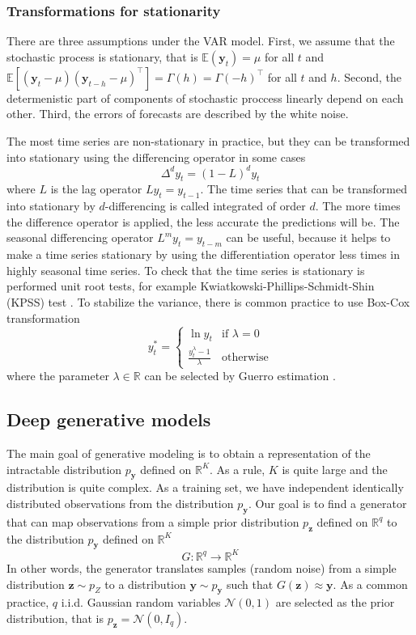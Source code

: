 \documentclass[12pt,a4paper]{article}
\begin{document}
\subsubsection{Transformations for stationarity}

There are three assumptions under the VAR model. First, we assume that the stochastic process is stationary, that is $\mathbb E (\mathbf y_t) = \mu$ for all $t$ and $\mathbb E [(\mathbf y_t - \mu)(\mathbf y_{t-h}-\mu)^\top] = \Gamma(h) = \Gamma(-h)^\top$ for all $t$ and $h$. Second, the determenistic part of components of stochastic proccess linearly depend on each other. Third, the errors of forecasts are described by the white noise.

The most time series are non-stationary in practice, but they can be transformed into stationary using the differencing operator in some cases
$$\Delta^d y_t = (1 - L)^d y_t$$
where $L$ is the lag operator $Ly_t = y_{t-1}$. The time series that can be transformed into stationary by $d$-differencing is called integrated of order $d$. The more times the difference operator is applied, the less accurate the predictions will be. The seasonal differencing operator $L^my_t = y_{t-m}$ can be useful, because it helps to make a time series stationary by using the differentiation operator less times in highly seasonal time series. To check that the time series is stationary is performed unit root tests, for example Kwiatkowski-Phillips-Schmidt-Shin (KPSS) test \cite{fpp3}. To stabilize the variance, there is common practice to use Box-Cox transformation
$$y_t^* = \begin{cases}
    \ln y_t & \text{if $\lambda = 0$} \\ 
    \frac{y_t^\lambda - 1}{\lambda} & \text{otherwise}
\end{cases}$$
where the parameter $\lambda \in \mathbb R$ can be selected by Guerro estimation \cite{guerrero93}.

\subsection{Deep generative models} \label{deepgenmodels}

The main goal of generative modeling is to obtain a representation of the intractable distribution $p_\mathbf y$ defined on $\mathbb R^K$. As a rule, $K$ is quite large and the distribution is quite complex. As a training set, we have independent identically distributed observations from the distribution $p_\mathbf y$. Our goal is to find a generator that can map observations from a simple prior distribution $p_\mathbf z$ defined on $\mathbb R^q$ to the distribution $p_\mathbf y$ defined on $\mathbb R^K$
$$G: \mathbb R^q \to \mathbb R^K$$
In other words, the generator translates samples (random noise) from a simple distribution $\mathbf z \sim p_Z$ to a distribution $\mathbf y \sim p_\mathbf y$ such that $G(\mathbf z) \approx \mathbf y$. As a common practice, $q$ i.i.d. Gaussian random variables $\mathcal N(0, 1)$ are selected as the prior distribution, that is $p_{\mathbf z} = \mathcal N(0, I_q)$.
\end{document}
